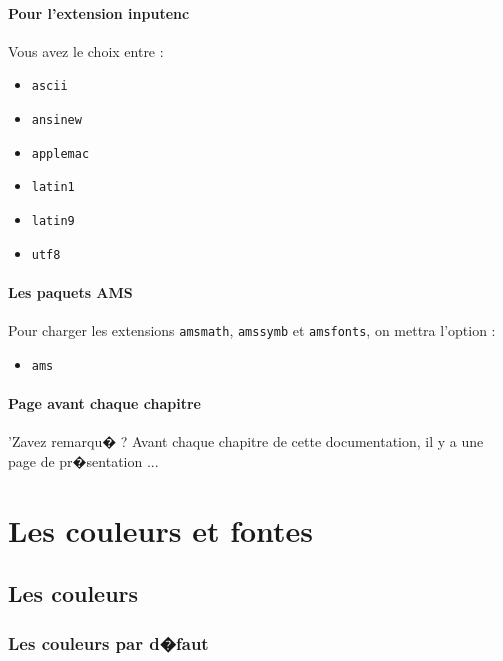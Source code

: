 \documentclass[ams,openany,10pt,presentation,latin1]{mathbook}
\begin{document}
\subsubsection{Pour l'extension \og inputenc \fg}

Vous avez le choix entre :

\begin{multicols}{3}
\begin{itemize}
\item \texttt{ascii}
\item \texttt{ansinew}
\item \texttt{applemac}
\item \texttt{latin1}
\item \texttt{latin9}
\item \texttt{utf8}
\end{itemize}
\end{multicols}

\subsubsection{Les paquets AMS}

Pour charger les extensions \texttt{amsmath}, \texttt{amssymb} et \texttt{amsfonts}, on mettra l'option :

\begin{itemize}
\item \texttt{ams}
\end{itemize}

\subsubsection{Page avant chaque chapitre}

'Zavez remarqu� ? Avant chaque chapitre de cette documentation, il y a une page de pr�sentation ...

\intro{}
\introauthor{}
\chapter{Les couleurs et fontes}

\section{Les couleurs}

\subsection{Les couleurs par d�faut}
\end{document}
